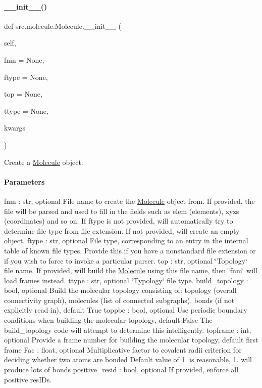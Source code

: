 \paragraph{\texorpdfstring{\+\_\+\+\_\+init\+\_\+\+\_\+()}{\_\_init\_\_()}}
{\footnotesize\ttfamily def src.\+molecule.\+Molecule.\+\_\+\+\_\+init\+\_\+\+\_\+ (\begin{DoxyParamCaption}\item[{}]{self,  }\item[{}]{fnm = {\ttfamily None},  }\item[{}]{ftype = {\ttfamily None},  }\item[{}]{top = {\ttfamily None},  }\item[{}]{ttype = {\ttfamily None},  }\item[{}]{kwargs }\end{DoxyParamCaption})}



Create a \hyperlink{classsrc_1_1molecule_1_1Molecule}{Molecule} object. 

\paragraph*{Parameters }

fnm \+: str, optional File name to create the \hyperlink{classsrc_1_1molecule_1_1Molecule}{Molecule} object from. If provided, the file will be parsed and used to fill in the fields such as elem (elements), xyzs (coordinates) and so on. If ftype is not provided, will automatically try to determine file type from file extension. If not provided, will create an empty object. ftype \+: str, optional File type, corresponding to an entry in the internal table of known file types. Provide this if you have a nonstandard file extension or if you wish to force to invoke a particular parser. top \+: str, optional \char`\"{}\+Topology\char`\"{} file name. If provided, will build the \hyperlink{classsrc_1_1molecule_1_1Molecule}{Molecule} using this file name, then \char`\"{}fnm\char`\"{} will load frames instead. ttype \+: str, optional \char`\"{}\+Typology\char`\"{} file type. build\+\_\+topology \+: bool, optional Build the molecular topology consisting of\+: topology (overall connectivity graph), molecules (list of connected subgraphs), bonds (if not explicitly read in), default True toppbc \+: bool, optional Use periodic boundary conditions when building the molecular topology, default False The build\+\_\+topology code will attempt to determine this intelligently. topframe \+: int, optional Provide a frame number for building the molecular topology, default first frame Fac \+: float, optional Multiplicative factor to covalent radii criterion for deciding whether two atoms are bonded Default value of 1. is reasonable, 1. will produce lots of bonds positive\+\_\+resid \+: bool, optional If provided, enforce all positive res\+I\+Ds. 

